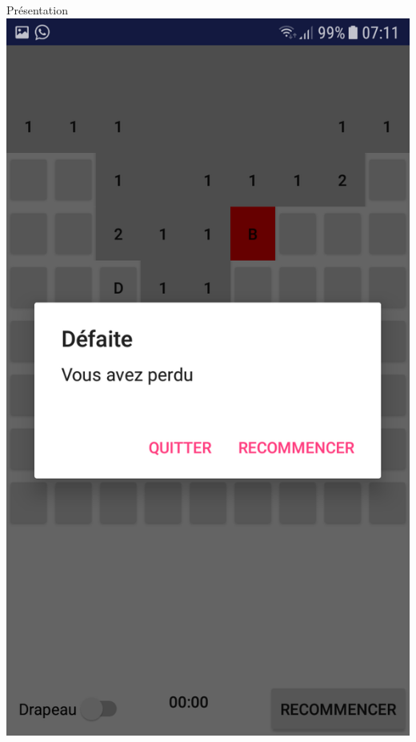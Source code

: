 \documentclass{beamer}
\begin{document}
\begin{frame}
\begin{block}{Présentation}
    \includegraphics[scale=0.15]{Images/3.png}
\end{block}

\end{frame}
\end{document}
